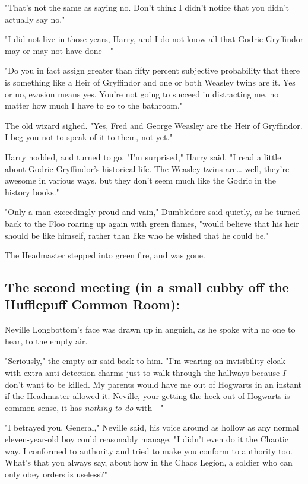 "That's not the same as saying no. Don't think I didn't notice that you didn't 
actually say no."

"I did not live in those years, Harry, and I do not know all that Godric 
Gryffindor may or may not have done---"

"Do you in fact assign greater than fifty percent subjective probability that 
there is something like a Heir of Gryffindor and one or both Weasley twins are 
it. Yes or no, evasion means yes. You're not going to succeed in distracting 
me, no matter how much I have to go to the bathroom."

The old wizard sighed. "Yes, Fred and George Weasley are the Heir of 
Gryffindor. I beg you not to speak of it to them, not yet."

Harry nodded, and turned to go. "I'm surprised," Harry said. "I read a little 
about Godric Gryffindor's historical life. The Weasley twins are{\ldots} well, 
they're awesome in various ways, but they don't seem much like the Godric in 
the history books."

"Only a man exceedingly proud and vain," Dumbledore said quietly, as he turned 
back to the Floo roaring up again with green flames, "would believe that his 
heir should be like himself, rather than like who he wished that he could be."

The Headmaster stepped into green fire, and was gone.
\sbreak
\subsection{The second meeting (in a small cubby off the Hufflepuff Common Room):}

Neville Longbottom's face was drawn up in anguish, as he spoke with no one to 
hear, to the empty air.

"Seriously," the empty air said back to him. "I'm wearing an invisibility cloak 
with extra anti-detection charms just to walk through the hallways because 
\emph{I} don't want to be killed. My parents would have me out of Hogwarts in 
an instant if the Headmaster allowed it. Neville, your getting the heck out of 
Hogwarts is common sense, it has \emph{nothing to do} with---"

"I betrayed you, General," Neville said, his voice around as hollow as any 
normal eleven-year-old boy could reasonably manage. "I didn't even do it the 
Chaotic way. I conformed to authority and tried to make you conform to 
authority too. What's that you always say, about how in the Chaos Legion, a 
soldier who can only obey orders is useless?"

